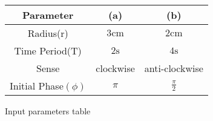 \centering
\begin{tabular}{|c|c|c|}
        \hline
        \textbf{Parameter} & \textbf{(a)} & \textbf{(b)} \\
        \hline
	Radius(r) & $3\text{cm}$ & $2\text{cm}$ \\
        \hline
	Time Period(T) & $2\text{s}$ & $4\text{s}$ \\
	\hline
	Sense & clockwise & anti-clockwise\\
	\hline
	Initial Phase$(\phi)$ & $\pi$ & $\frac{\pi}{2}$ \\
	\hline
\end{tabular}
\caption{Input parameters table}
\label{tab:11.14.11}
